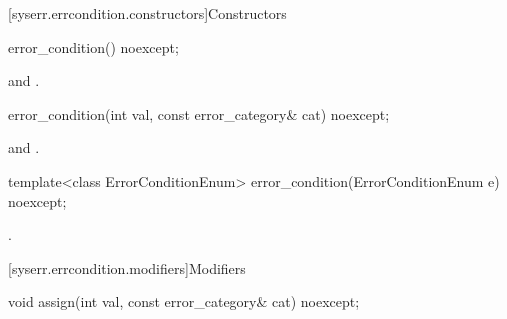 [syserr.errcondition.constructors]{Constructors}

%
\begin{itemdecl}
error_condition() noexcept;
\end{itemdecl}

\begin{itemdescr}
\pnum
{}

\pnum
\ensures {} and .
\end{itemdescr}

%
\begin{itemdecl}
error_condition(int val, const error_category& cat) noexcept;
\end{itemdecl}

\begin{itemdescr}
\pnum
{}

\pnum
\ensures {} and .
\end{itemdescr}

%
\begin{itemdecl}
template<class ErrorConditionEnum>
  error_condition(ErrorConditionEnum e) noexcept;
\end{itemdecl}

\begin{itemdescr}
\pnum
{}

\pnum
\ensures {}.

\pnum
{}

\end{itemdescr}


[syserr.errcondition.modifiers]{Modifiers}

%
\begin{itemdecl}
void assign(int val, const error_category& cat) noexcept;
\end{itemdecl}

